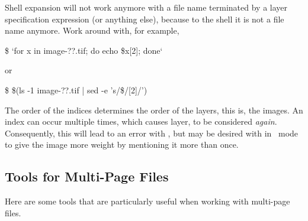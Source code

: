\begin{geeknote}
  Shell expansion will not work anymore with a file name terminated by
  a layer specification expression (or anything else), because to the
  shell it is not a file name anymore.  Work around with, for example,

  \begin{terminal}
    \$ \app{} `for x in image-??.tif; do echo \$x[2]; done`
  \end{terminal}

  \noindent or

  \begin{terminal}
    \$ \app{} \$(ls -1 image-??.tif | sed -e 's/\$/[2]/')
  \end{terminal}

  The order of the indices determines the order of the layers, this
  is, the images.  An index can occur multiple times, which causes
  layer, to be considered \emph{again}.  Consequently, this will lead
  to an error with , but may be desired with
   in ~mode to give the image more
  weight by mentioning it more than once.
\end{geeknote}


\subsection[Tools for Multi-Page Files]{Tools for Multi-Page Files
  \label{sec:tools-for-multi-page-files}
  }

Here are some tools that are particularly useful when working with
multi-page files.

